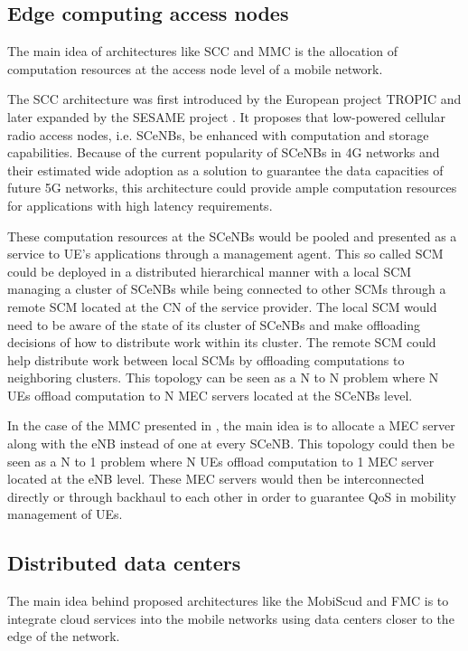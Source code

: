 \subsection{Edge computing access nodes}

\noindent The main idea of architectures like \acrfull{SCC} and \acrfull{MMC} is the allocation of computation resources at the access node level of a mobile network.

The \acrfull{SCC} architecture was first introduced by the European project TROPIC \cite{smallcellcloud} and later expanded by the SESAME project \cite{SESAM}. It proposes that low-powered cellular radio access nodes, i.e. \acrfull{SCeNBs}, be enhanced with computation and storage capabilities. Because of the current popularity of \acrshort{SCeNBs} in 4G networks and their estimated wide adoption as a solution to guarantee the data capacities of future 5G networks, this architecture could provide ample computation resources for applications with high latency requirements.

These computation resources at the \acrshort{SCeNBs} would be pooled and presented as a service to \acrshort{UE}'s applications through a management agent. This so called \acrfull{SCM} could be deployed in a distributed hierarchical manner with a local \acrshort{SCM} managing a cluster of \acrshort{SCeNBs} while being connected to other \acrshort{SCM}s through a remote \acrshort{SCM} located at the \acrshort{CN} of the service provider. The local \acrshort{SCM} would need to be aware of the state of its cluster of \acrshort{SCeNBs} and make offloading decisions of how to distribute work within its cluster. The remote \acrshort{SCM} could help distribute work between local \acrshort{SCM}s by offloading computations to neighboring clusters. This topology can be seen as a N to N problem where N \acrshort{UE}s offload computation to N \acrshort{MEC} servers located at the \acrshort{SCeNBs} level.

In the case of the \acrfull{MMC} presented in \cite{mmcloud}, the main idea is to allocate a \acrshort{MEC} server along with the \acrfull{eNB} instead of one at every SCeNB. This topology could then be seen as a N to 1 problem where N \acrshort{UE}s offload computation to 1 \acrshort{MEC} server located at the \acrshort{eNB} level. These \acrshort{MEC} servers would then be interconnected directly or through backhaul to each other in order to guarantee \acrshort{QoS} in mobility management of \acrshort{UE}s.

\subsection{Distributed data centers}
\noindent The main idea behind proposed architectures like the \acrfull{MobiScud} \cite{MobiScud} and \acrfull{FMC} \cite{fmcloud} is to integrate cloud services into the mobile networks using data centers closer to the edge of the network.

